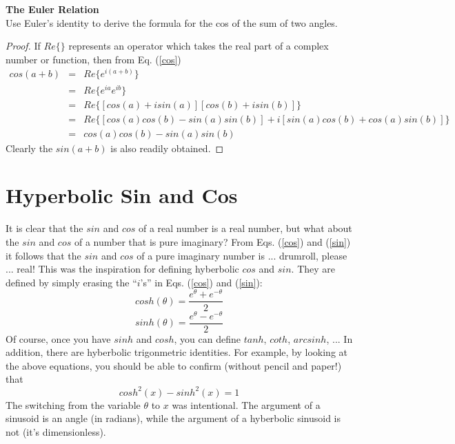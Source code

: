 \begin{example}
\textbf{The Euler Relation}\\
Use Euler's identity to derive the formula for the cos of the 
sum of two angles.
\end{example}
\begin{proof}
If $Re \{ \}$ represents an operator which takes the real
part of a complex number or function, then from
Eq. (\ref{cos})
\begin{eqnarray*}
cos(a + b) &=& Re \{ e^{i(a + b)} \} \\
&=& Re \{ e^{ia} e^{ib} \} \\
&=& Re \{ [cos(a) + i sin(a)] [cos(b) + i sin(b)] \} \\
&=& Re \{ [cos(a) cos(b) - sin(a) sin(b)] + i[sin(a) cos(b) + cos(a) sin(b)] \} \\
&=& cos(a) cos(b) - sin(a) sin(b)
\end{eqnarray*}
Clearly the $sin(a+b)$ is also readily obtained.
\end{proof}

\section{Hyperbolic Sin and Cos}
It is clear that the $sin$ and $cos$ of a real number is
a real number, but what about the $sin$ and $cos$ of a 
number that is pure imaginary?
From Eqs. (\ref{cos}) and (\ref{sin}) it follows that the $sin$ and
$cos$ of a pure imaginary number is ... drumroll, please ... real!
This was the inspiration for defining hyberbolic $cos$ and $sin$.
They are defined by simply erasing the ``$i$'s'' in Eqs. (\ref{cos})
and (\ref{sin}):
\begin{equation}
cosh(\theta ) = \frac {e^{\theta} + e^{- \theta}}{2}
\end{equation}
\begin{equation}
sinh( \theta ) = \frac {e^{\theta} - e^{- \theta}}{2}
\end{equation}
Of course, once you have $sinh$ and $cosh$, you can define
$tanh$, $coth$, $arcsinh$, ...  In addition, there are 
hyberbolic trigonmetric identities.  For example, by looking
at the above equations, you should be able to confirm
(without pencil and paper!) that
\begin{equation}
cosh^2(x) - sinh^2(x) = 1
\end{equation}
The switching from the variable $\theta$ to $x$ was intentional.
The argument of a sinusoid is an angle (in radians), while
the argument of a hyberbolic sinusoid is not (it's dimensionless).

